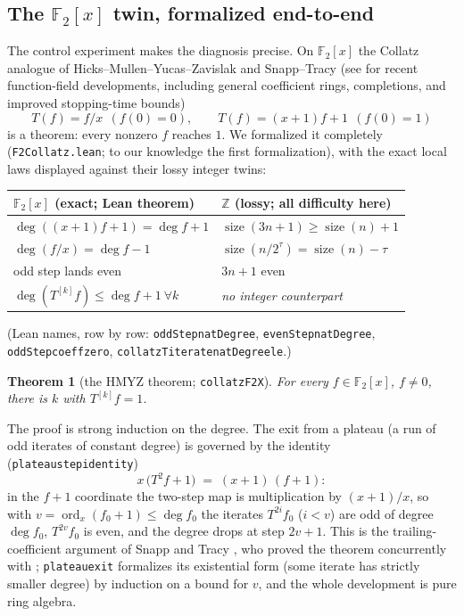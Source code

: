 \documentclass[11pt]{amsart}
\newtheorem{theorem}{Theorem}[section]
\theoremstyle{definition}
\theoremstyle{remark}
\newcommand{\size}{\operatorname{size}}
\newcommand{\lean}[1]{{\def\_{\textunderscore\allowbreak}\texttt{#1}}}
\newcommand{\F}{\mathbb{F}}
\newcommand{\Z}{\mathbb{Z}}
\begin{document}
\subsection{The $\F_2[x]$ twin, formalized end-to-end}
The control experiment makes the diagnosis precise.  On $\F_2[x]$ the
Collatz analogue of Hicks--Mullen--Yucas--Zavislak \cite{HMYZ2008} and
Snapp--Tracy \cite{SnappTracy2008}
(see \cite{BehajainaParan2023,BehajainaParan2023b,AlonBehajainaParan2024}
for recent function-field developments, including general coefficient rings,
completions, and improved stopping-time bounds)
\[
T(f) = f/x \ \ (f(0)=0), \qquad T(f) = (x+1)f + 1 \ \ (f(0)=1)
\]
is a theorem: every nonzero $f$ reaches $1$.  We formalized it completely
(\lean{F2Collatz.lean}; to our knowledge the first formalization), with the
exact local laws displayed against their lossy integer twins:

\begin{center}
\begin{tabular}{ll}
\toprule
$\F_2[x]$ (exact; Lean theorem) & $\Z$ (lossy; all difficulty here)\\
\midrule
$\deg((x{+}1)f{+}1) = \deg f + 1$ & $\size(3n{+}1) \ge \size(n)+1$\\
$\deg(f/x) = \deg f - 1$ & $\size(n/2^{\tau}) = \size(n) - \tau$\\
odd step lands even & $3n+1$ even\\
$\deg(T^{[k]}f) \le \deg f + 1\ \forall k$ & \emph{no integer counterpart}\\
\bottomrule
\end{tabular}
\end{center}

\noindent
(Lean names, row by row: \lean{oddStep\_natDegree},
\lean{evenStep\_natDegree}, \lean{oddStep\_coeff\_zero},
\lean{collatzT\_iterate\_natDegree\_le}.)

\begin{theorem}[the HMYZ theorem; \lean{collatz\_F2X}]\label{thm:f2x}
For every $f \in \F_2[x]$, $f \ne 0$, there is $k$ with $T^{[k]}f = 1$.
\end{theorem}

The proof is strong induction on the degree.  The exit from a plateau (a run
of odd iterates of constant degree) is governed by the identity
(\lean{plateau\_step\_identity})
\[
x\,\bigl(T^{2}f + 1\bigr) \;=\; (x+1)\,(f+1):
\]
in the $f+1$ coordinate the two-step map is multiplication by $(x{+}1)/x$,
so with $v = \operatorname{ord}_x(f_0+1) \le \deg f_0$ the iterates
$T^{2i}f_0$ ($i < v$) are odd of degree $\deg f_0$, $T^{2v}f_0$ is even, and
the degree drops at step $2v+1$.  This is the trailing-coefficient argument
of Snapp and Tracy \cite{SnappTracy2008}, who proved the theorem
concurrently with \cite{HMYZ2008}; \lean{plateau\_exit} formalizes its
existential form (some iterate has strictly smaller degree) by induction on
a bound for $v$, and the whole development is pure ring algebra.
\end{document}
